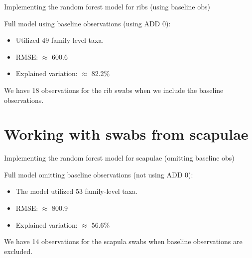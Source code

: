 \documentclass{beamer}
\begin{document}
\begin{frame}{Implementing the random forest model for ribs (using baseline obs)}

  \noindent Full model using baseline observations (using ADD 0):
  \begin{itemize}
    \item Utilized 49 family-level taxa.
    \item RMSE: $\approx$ 600.6  
    \item Explained variation: $\approx$ 82.2\%
  \end{itemize}
  
  \vspace{0.1in}

  \noindent We have 18 observations for the rib swabs when we include the
  baseline observations.

\end{frame}




\section[Scapula swabs]{Working with swabs from scapulae}

\begin{frame}{Implementing the random forest model for scapulae (omitting baseline obs)}

  \noindent Full model omitting baseline observations (not using ADD 0):
  \begin{itemize}
    \item The model utilized 53 family-level taxa. %
    \item RMSE: $\approx$ 800.9
    \item Explained variation: $\approx$ 56.6\%
  \end{itemize}
  \vspace{0.1in}

  \noindent We have 14 observations for the scapula swabs when baseline
  observations are excluded.

\end{frame}
\end{document}

